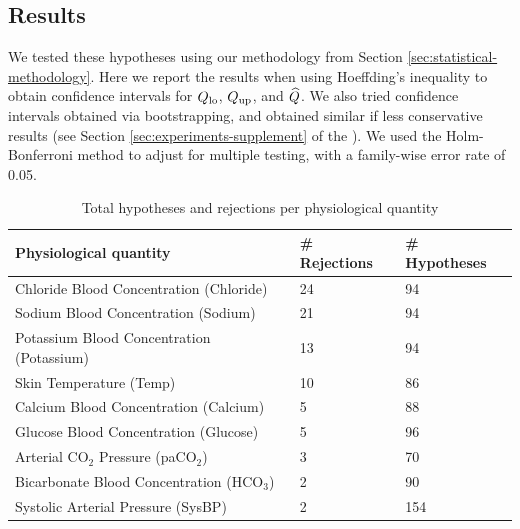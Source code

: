 \subsection{Results} 

We tested these hypotheses using our methodology from Section \ref{sec:statistical-methodology}.
Here we report the results when using Hoeffding's inequality to obtain confidence intervals for $Q_{\mathrm{lo}}$, $Q_{\mathrm{up}}$, and $\widehat{Q}$.
We also tried confidence intervals obtained via bootstrapping, and obtained similar if less conservative results (see Section \ref{sec:experiments-supplement} of the \AppendixName).
We used the Holm-Bonferroni method to adjust for multiple testing, with a family-wise error rate of 0.05.

%

%
%
%
%
%
%
%
%
%
%
%
%
%
%
%
%
%
%
%
%
%
%
%
%
%
%

\begin{table}%
    \centering
\begin{footnotesize}
\begin{tabular}{lll}
\toprule
                   Physiological quantity &  \# Rejections &  \# Hypotheses \\
\midrule
  Chloride Blood Concentration (Chloride) &            24 &            94 \\
      Sodium Blood Concentration (Sodium) &            21 &            94 \\
Potassium Blood Concentration (Potassium) &            13 &            94 \\
                  Skin Temperature (Temp) &            10 &            86 \\
    Calcium Blood Concentration (Calcium) &             5 &            88 \\
    Glucose Blood Concentration (Glucose) &             5 &            96 \\
      Arterial CO$_2$ Pressure (paCO$_2$) &             3 &            70 \\
Bicarbonate Blood Concentration (HCO$_3$) &             2 &            90 \\
       Systolic Arterial Pressure (SysBP) &             2 &           154 \\
\bottomrule
\end{tabular}
\end{footnotesize}
    \caption{Total hypotheses and rejections per physiological quantity} \label{tab:hypotheses}
\end{table}


